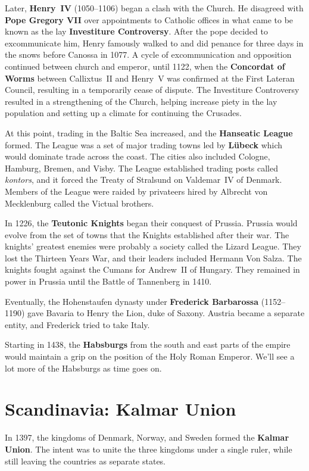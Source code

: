 Later, \textbf{Henry~IV} (1050--1106) began a clash with the Church.
He disagreed with \textbf{Pope Gregory VII} over appointments to Catholic offices
in what came to be known as the lay \textbf{Investiture Controversy}.
After the pope decided to excommunicate him,
Henry famously walked to and did penance for three days in the snows before Canossa in 1077.
A cycle of excommunication and opposition continued between church and emperor,
until 1122, when the \textbf{Concordat of Worms} between Callixtus~II and Henry~V
was confirmed at the First Lateran Council,
resulting in a temporarily cease of dispute.
The Investiture Controversy resulted in a strengthening of the Church,
helping increase piety in the lay population and setting up a climate for continuing the Crusades.

At this point, trading in the Baltic Sea increased, and the \textbf{Hanseatic League} formed.
The League was a set of major trading towns
led by \textbf{L\"ubeck} which would dominate trade across the coast.
The cities also included Cologne, Hamburg, Bremen, and Visby.
The League established trading posts called \textit{kontors},
and it forced the Treaty of Stralsund on Valdemar~IV of Denmark.
Members of the League were raided by privateers
hired by Albrecht von Mecklenburg called the Victual brothers.

In 1226, the \textbf{Teutonic Knights} began their conquest of Prussia.
Prussia would evolve from the set of towns that the Knights established after their war.
The knights' greatest enemies were probably a society called the Lizard League.
They lost the Thirteen Years War, and their leaders included Hermann Von Salza.
The knights fought against the Cumans for Andrew~II of Hungary.
They remained in power in Prussia until the Battle of Tannenberg in 1410.

Eventually, the Hohenstaufen dynasty under \textbf{Frederick Barbarossa} (1152--1190)
gave Bavaria to Henry the Lion, duke of Saxony.
Austria became a separate entity, and Frederick tried to take Italy.

Starting in 1438, the \textbf{Habsburgs} from the south and east parts of the empire
would maintain a grip on the position of the Holy Roman Emperor.
We'll see a lot more of the Habsburgs as time goes on.

\section{Scandinavia: Kalmar Union}

In 1397, the kingdoms of Denmark, Norway, and Sweden formed the \textbf{Kalmar Union}.
The intent was to unite the three kingdoms under a single ruler,
while still leaving the countries as separate states.

